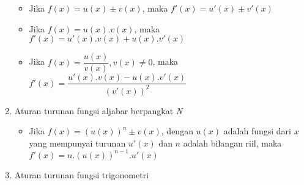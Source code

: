 \begin{enumerate}[1.]
		\begin{itemize}

			\item Jika  \begin{math} f(x) =  u(x) \pm v(x) \end{math}, maka  \begin{math} f'(x) =  u'(x) \pm v'(x) \end{math}
			\item Jika  \begin{math} f(x) =  u(x).v(x) \end{math}, maka \begin{math} f'(x) =  u'(x).v(x) + u(x).v'(x) \end{math}
			\item Jika  \begin{math} f(x) = \dfrac{u(x)}{v(x)}, v(x) \neq 0 \end{math}, maka  \begin{math} f'(x) = \dfrac{u'(x).v(x) - u(x).v'(x)}{(v'(x))^{2}} \end{math}

		\end{itemize}

	\item Aturan turunan fungsi aljabar berpangkat \textit{N}

		\begin{itemize}

			\item Jika \begin{math} f(x) = (u(x))^{n} \pm v(x) \end{math}, dengan \begin{math} u(x) \end{math} adalah fungsi dari \begin{math} x \end{math} yang mempunyai turunan \begin{math} u'(x) \end{math} dan \begin{math} n \end{math} adalah
			bilangan riil, maka \begin{math} f'(x) = n.(u(x))^{n-1}.u'(x) \end{math}

		\end{itemize}

	\item Aturan turunan fungsi trigonometri

		\begin{itemize}


\end{itemize}
\end{enumerate}
